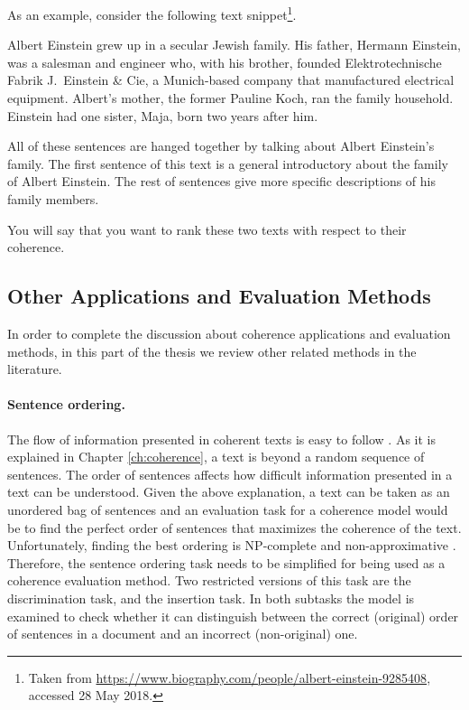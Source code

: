 %
As an example, consider the following text snippet\footnote{Taken from \url{https://www.biography.com/people/albert-einstein-9285408}, accessed 28 May 2018.}.

\begin{examples}
Albert Einstein grew up in a secular Jewish family. 
His father, Hermann Einstein, was a salesman and engineer who, with his brother, founded Elektrotechnische Fabrik J.\ Einstein \& Cie, a Munich-based company that manufactured electrical equipment. 
Albert’s mother, the former Pauline Koch, ran the family household. 
Einstein had one sister, Maja, born two years after him.
\end{examples}
All of these sentences are hanged together by talking about Albert Einstein's family. 
The first sentence of this text is a general introductory about the family of Albert Einstein. 
The rest of sentences give more specific descriptions of his family members. 

You will say that you want to rank these two texts with respect to their coherence. 


\subsection{Other Applications and Evaluation Methods}

In order to complete the discussion about coherence applications and evaluation methods, 
in this part of the thesis we review other related methods in the literature. 

\paragraph{Sentence ordering.} 
The flow of information presented in coherent texts is easy to follow \cite{lapata03,barzilay04,karamanis04b,barzilay05a,soricut06}. 
As it is explained in Chapter \ref{ch:coherence}, a text is beyond a random sequence of sentences. 
The order of sentences affects how difficult information presented in a text can be understood.  
Given the above explanation, a text can be taken as an unordered bag of sentences and an evaluation task for a coherence model would be to find the perfect order of sentences that maximizes the coherence of the text.  
Unfortunately, finding the best ordering is NP-complete \cite{?} and non-approximative \cite{althaus04}.
Therefore, the sentence ordering task needs to be simplified for being used as a coherence evaluation method. 
Two restricted versions of this task are the discrimination task, and the insertion task. 
In both subtasks the model is examined to check whether it can distinguish between the correct (original) order of sentences in a document and an incorrect (non-original) one. 



